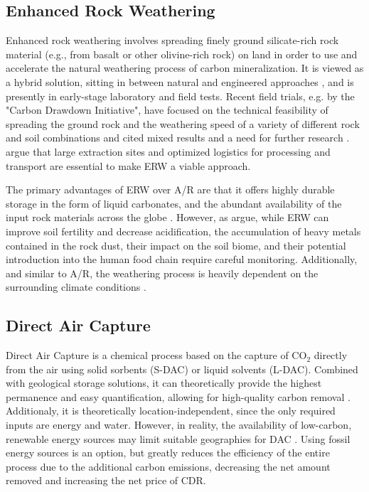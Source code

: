 \subsection{Enhanced Rock Weathering}
Enhanced rock weathering involves spreading finely ground silicate-rich rock material (e.g., from basalt or other olivine-rich rock) on land in order to use and accelerate the natural weathering process of carbon mineralization. It is viewed as a hybrid solution, sitting in between natural and engineered approaches \parencite{manning_enhanced_2025}, and is presently in early-stage laboratory and field tests. Recent field trials, e.g. by the "Carbon Drawdown Initiative", have focused on the technical feasibility of spreading the ground rock and the weathering speed of a variety of different rock and soil combinations and cited mixed results and a need for further research \parencite{carbon_drawdown_initiative_how_2022, hammes_soil_2025}. \textcite{madankan_larger_2025} argue that large extraction sites and optimized logistics for processing and transport are essential to make ERW a viable approach.\vspace{2mm}

The primary advantages of ERW over A/R are that it offers highly durable storage in the form of liquid carbonates, and the abundant availability of the input rock materials across the globe \parencite{lackner_progress_1997}. However, as \textcite{gaucher_leveraging_2025} argue, while ERW can  improve soil fertility and decrease acidification, the accumulation of heavy metals contained in the rock dust, their impact on the soil biome, and their potential introduction into the human food chain require careful monitoring. Additionally, and similar to A/R, the weathering process is heavily dependent on the surrounding climate conditions \parencite{hangx_coastal_2009}.

\subsection{Direct Air Capture}
Direct Air Capture is a chemical process based on the capture of CO$_2$ directly from the air using solid sorbents (S-DAC) or liquid solvents (L-DAC). Combined with geological storage solutions, it can theoretically provide the highest permanence and easy quantification, allowing for high-quality carbon removal \parencite{stolten_neue_2022}. Additionaly, it is theoretically location-independent, since the only required inputs are energy and water. However, in reality, the availability of low-carbon, renewable energy sources may limit suitable geographies for DAC \parencite{eke_comprehensive_2025}. Using fossil energy sources is an option, but greatly reduces the efficiency of the entire process due to the additional carbon emissions, decreasing the net amount removed and increasing the net price of CDR.\vspace{2mm}

